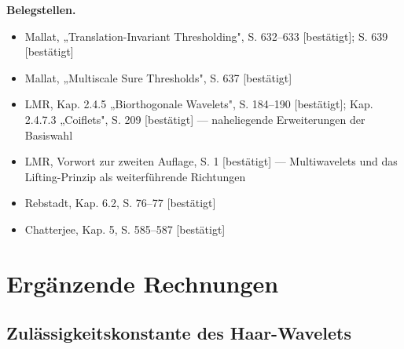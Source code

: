 \documentclass[a4paper,11pt,bibliography=totoc,listof=totoc,headinclude=true,cleardoublepage=empty,oneside]{scrbook}
\newcommand{\quellen}[1]{%
  \par\smallskip
  {\color{uhh_blue}\small\textbf{Belegstellen.}\ #1}%
  \par\medskip}
\theoremstyle{plain}
\theoremstyle{definition}
\begin{document}
\quellen{
  \begin{itemize}
    \item Mallat, „Translation-Invariant Thresholding", S. 632–633 [bestätigt]; S. 639 [bestätigt]
    \item Mallat, „Multiscale Sure Thresholds", S. 637 [bestätigt]
    \item LMR, Kap. 2.4.5 „Biorthogonale Wavelets", S. 184–190 [bestätigt]; Kap. 2.4.7.3 „Coiflets", S. 209 [bestätigt] — naheliegende Erweiterungen der Basiswahl
    \item LMR, Vorwort zur zweiten Auflage, S. 1 [bestätigt] — Multiwavelets und das Lifting-Prinzip als weiterführende Richtungen
    \item Rebstadt, Kap. 6.2, S. 76–77 [bestätigt]
    \item Chatterjee, Kap. 5, S. 585–587 [bestätigt]
  \end{itemize}
}

\appendix

\chapter{Ergänzende Rechnungen}
\label{chapter:anhang-rechnungen}
 
\section{Zulässigkeitskonstante des Haar-Wavelets}
\label{anh:haar-konstante}
 
\end{document}
